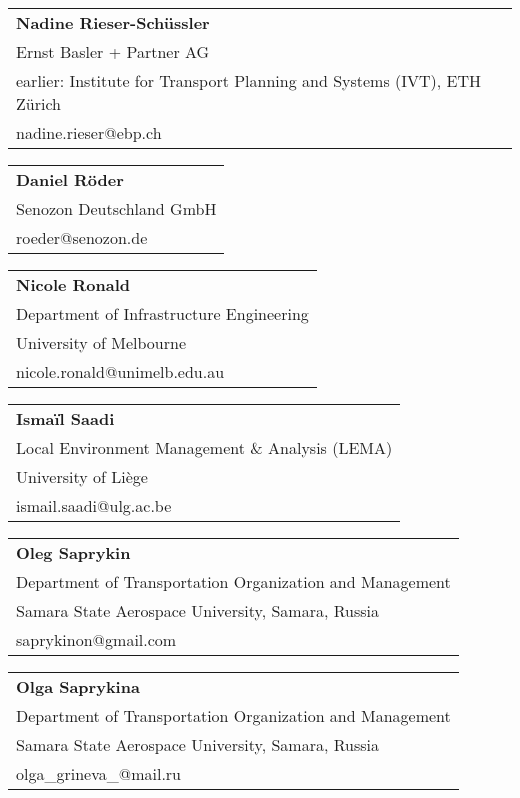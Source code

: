 \begin{tabular}[width=0.48\textwidth]{@{}l}
\textbf{Nadine Rieser-Schüssler} \\
Ernst Basler + Partner AG \\
earlier: Institute for Transport Planning and Systems (IVT), ETH Zürich \\
nadine.rieser@ebp.ch \\
\end{tabular}

\begin{tabular}[width=0.48\textwidth]{@{}l}
\textbf{Daniel Röder} \\
Senozon Deutschland GmbH \\
roeder@senozon.de \\
\end{tabular}

\begin{tabular}[width=0.48\textwidth]{@{}l}
\textbf{Nicole Ronald} \\
Department of Infrastructure Engineering \\
University of Melbourne \\
nicole.ronald@unimelb.edu.au \\
\end{tabular}

\begin{tabular}[width=0.48\textwidth]{@{}l}
\textbf{Ismaïl Saadi} \\
Local Environment Management \& Analysis (LEMA) \\
University of Liège \\
ismail.saadi@ulg.ac.be \\
\end{tabular}

\begin{tabular}[width=0.48\textwidth]{@{}l}
\textbf{Oleg Saprykin} \\
Department of Transportation Organization and Management \\
Samara State Aerospace University, Samara, Russia \\
saprykinon@gmail.com \\
\end{tabular}

\begin{tabular}[width=0.48\textwidth]{@{}l}
\textbf{Olga Saprykina} \\
Department of Transportation Organization and Management \\
Samara State Aerospace University, Samara, Russia \\
olga\_grineva\_@mail.ru \\
\end{tabular}

